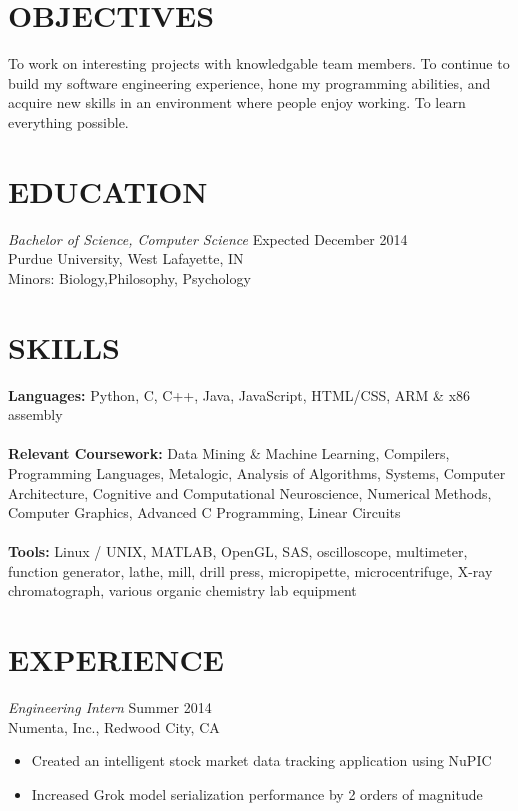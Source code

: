 \documentclass[margin,5pt]{res} %
\begin{document}
\address{viraj@purdue.edu\\ vsinha.com \\github.com/vsinha}
\address{217 Pierce St. Unit 2 \\ West Lafayette, IN 47906\\(408) 505-1275}


\begin{resume}

 
\section{OBJECTIVES}To work on interesting projects with knowledgable team members. To continue to build
my software engineering experience, hone my programming abilities, and acquire new skills
in an environment where people enjoy working. To learn everything possible.

 

\section{EDUCATION} {\sl Bachelor of Science, Computer Science }\hfill Expected December 2014\\
               	 	    Purdue University, West Lafayette, IN\\
                	 	    Minors: Biology,Philosophy,  Psychology 
 

\section{SKILLS} {\bf Languages:} Python, C, C++, Java, JavaScript, HTML/CSS, ARM \& x86 assembly\\ \\
 		      {\bf Relevant Coursework:} Data Mining \& Machine Learning, Compilers, Programming Languages, Metalogic, Analysis of Algorithms, 
							Systems, Computer Architecture, Cognitive and Computational Neuroscience,
							Numerical Methods, Computer Graphics, Advanced C Programming, Linear Circuits\\ \\
		      {\bf Tools:} Linux / UNIX, MATLAB, OpenGL, SAS, oscilloscope, multimeter, function generator, lathe, mill, drill press, 
					micropipette, microcentrifuge, X-ray chromatograph, various organic chemistry lab equipment
 

\section{EXPERIENCE} {\sl Engineering Intern} \hfill Summer 2014\\
               Numenta, Inc., Redwood City, CA
                \begin{itemize} \itemsep -2pt
                \item Created an intelligent stock market data tracking application using NuPIC
                \item Increased Grok model serialization performance by 2 orders of magnitude
	       \end{itemize}



\end{resume}
\end{document}

